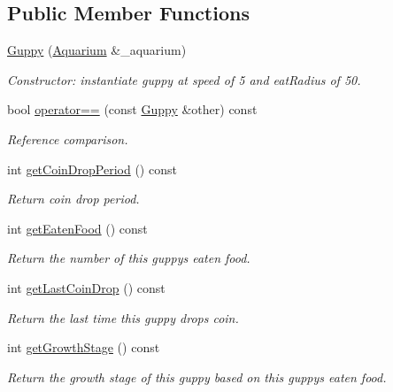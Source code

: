 \subsection*{Public Member Functions}
\begin{DoxyCompactItemize}
\item 
\mbox{\hyperlink{class_guppy_a6759d8e672846fcabdfee3df44e06275}{Guppy}} (\mbox{\hyperlink{class_aquarium}{Aquarium}} \&\+\_\+aquarium)
\begin{DoxyCompactList}\small\item\em Constructor\+: instantiate guppy at speed of 5 and eat\+Radius of 50. \end{DoxyCompactList}\item 
bool \mbox{\hyperlink{class_guppy_a048b328073ca8bec199c50b41cbc4108}{operator==}} (const \mbox{\hyperlink{class_guppy}{Guppy}} \&other) const
\begin{DoxyCompactList}\small\item\em Reference comparison. \end{DoxyCompactList}\item 
int \mbox{\hyperlink{class_guppy_a30d6fd06e3960eb1ea078bccdd23e12e}{get\+Coin\+Drop\+Period}} () const
\begin{DoxyCompactList}\small\item\em Return coin drop period. \end{DoxyCompactList}\item 
int \mbox{\hyperlink{class_guppy_a0a57ee7e3bee04fb9dfe261e7f0f551e}{get\+Eaten\+Food}} () const
\begin{DoxyCompactList}\small\item\em Return the number of this guppy\textquotesingle{}s eaten food. \end{DoxyCompactList}\item 
int \mbox{\hyperlink{class_guppy_aeb89955aa47fafc160580a6d09363826}{get\+Last\+Coin\+Drop}} () const
\begin{DoxyCompactList}\small\item\em Return the last time this guppy drops coin. \end{DoxyCompactList}\item 
int \mbox{\hyperlink{class_guppy_a786cdeea3d03f342cedaedf85339ba20}{get\+Growth\+Stage}} () const
\begin{DoxyCompactList}\small\item\em Return the growth stage of this guppy based on this guppy\textquotesingle{}s eaten food. \end{DoxyCompactList}\item 

\end{DoxyCompactItemize}

